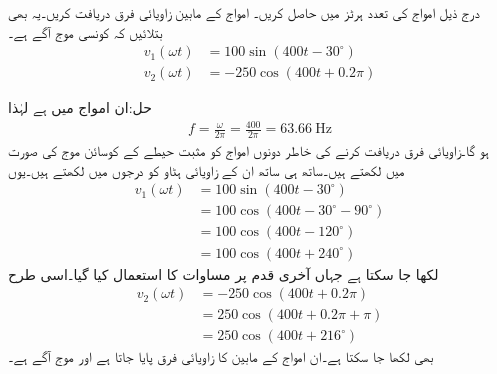 درج ذیل امواج کی تعدد ہرٹز میں حاصل کریں۔ امواج کے مابین زاویائی فرق دریافت کریں۔یہ بھی بتلائیں کہ کونسی موج آگے ہے۔
\begin{align*}
v_1(\omega t)&=100\sin(400t -30^{\circ})\\
v_2(\omega t)&=-250\cos(400t+0.2\pi)
\end{align*}

حل:ان امواج میں  ہے لہٰذا
\begin{align*}
f=\frac{\omega}{2\pi}=\frac{400}{2\pi}=\SI{63.66}{\hertz}
\end{align*}
ہو گا۔زاویائی فرق دریافت کرنے کی خاطر دونوں امواج کو مثبت حیطے کے کوسائن موج کی صورت میں لکھتے ہیں۔ساتھ ہی ساتھ ان کے زاویائی ہٹاو کو درجوں میں لکھتے ہیں۔یوں
\begin{align*}
v_1(\omega t)&=100\sin(400t -30^{\circ})\\
&=100\cos(400t-30^{\circ}-90^{\circ})\\
&=100\cos(400t-120^{\circ})\\
&=100\cos(400t+240^{\circ})
\end{align*}
لکھا جا سکتا ہے جہاں آخری قدم پر مساوات  کا استعمال کیا گیا۔اسی طرح
\begin{align*}
v_2(\omega t)&=-250\cos(400t+0.2\pi)\\
&=250\cos(400t+0.2\pi+\pi)\\
&=250\cos(400t+216^{\circ})
\end{align*}
بھی لکھا جا سکتا ہے۔ان امواج کے مابین  کا زاویائی فرق پایا جاتا ہے اور موج  آگے ہے۔

